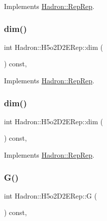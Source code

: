 Implements \mbox{\hyperlink{structHadron_1_1RepRep_a92c8802e5ed7afd7da43ccfd5b7cd92b}{Hadron\+::\+Rep\+Rep}}.

\mbox{\label{structHadron_1_1H5o2D2ERep_a40f428f685690d7f21b349010893970c}} 
\subsubsection{\texorpdfstring{dim()}{dim()}\hspace{0.1cm}{\footnotesize\ttfamily [2/3]}}
{\footnotesize\ttfamily int Hadron\+::\+H5o2\+D2\+E\+Rep\+::dim (\begin{DoxyParamCaption}{ }\end{DoxyParamCaption}) const\hspace{0.3cm}{\ttfamily [inline]}, {\ttfamily [virtual]}}



Implements \mbox{\hyperlink{structHadron_1_1RepRep_a92c8802e5ed7afd7da43ccfd5b7cd92b}{Hadron\+::\+Rep\+Rep}}.

\mbox{\label{structHadron_1_1H5o2D2ERep_a40f428f685690d7f21b349010893970c}} 
\subsubsection{\texorpdfstring{dim()}{dim()}\hspace{0.1cm}{\footnotesize\ttfamily [3/3]}}
{\footnotesize\ttfamily int Hadron\+::\+H5o2\+D2\+E\+Rep\+::dim (\begin{DoxyParamCaption}{ }\end{DoxyParamCaption}) const\hspace{0.3cm}{\ttfamily [inline]}, {\ttfamily [virtual]}}



Implements \mbox{\hyperlink{structHadron_1_1RepRep_a92c8802e5ed7afd7da43ccfd5b7cd92b}{Hadron\+::\+Rep\+Rep}}.

\mbox{\label{structHadron_1_1H5o2D2ERep_a200f65c803901ee97ab23f0b2b4e0c3f}} 
\subsubsection{\texorpdfstring{G()}{G()}\hspace{0.1cm}{\footnotesize\ttfamily [1/2]}}
{\footnotesize\ttfamily int Hadron\+::\+H5o2\+D2\+E\+Rep\+::G (\begin{DoxyParamCaption}{ }\end{DoxyParamCaption}) const\hspace{0.3cm}{\ttfamily [inline]}, {\ttfamily [virtual]}}

